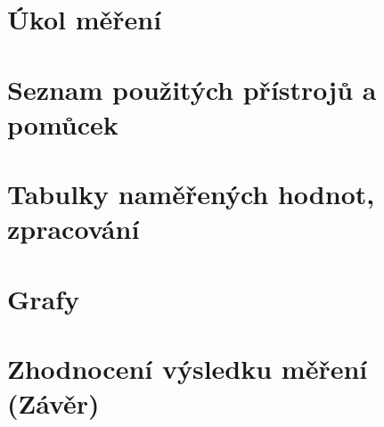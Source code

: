 \documentclass[a4paper,12pt]{report}
\begin{document}
\titlep

\pagestyle{plain}
\newpage


\section{Úkol měření}
\section{Seznam použitých přístrojů a pomůcek}
\section{Tabulky naměřených hodnot, zpracování}
\section{Grafy}
\section{Zhodnocení výsledku měření (Závěr)}
\end{document}
